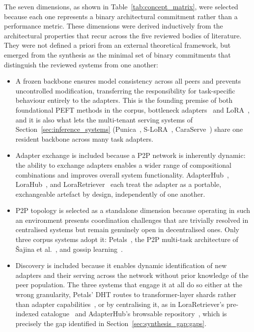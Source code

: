 The seven dimensions, as shown in Table~\ref{tab:concept_matrix}, were selected because each one represents a binary architectural commitment rather than a performance metric. These dimensions were derived inductively from the architectural properties that recur across the five reviewed bodies of literature. They were not defined a priori from an external theoretical framework, but emerged from the synthesis as the minimal set of binary commitments that distinguish the reviewed systems from one another:
\begin{itemize}
    \item A frozen backbone ensures model consistency across all peers and prevents uncontrolled modification, transferring the responsibility for task-specific behaviour entirely to the adapters. This is the founding premise of both foundational PEFT methods in the corpus, bottleneck adapters~\cite{Houlsby2019} and LoRA~\cite{Hu2022}, and it is also what lets the multi-tenant serving systems of Section~\ref{sec:inference_systems} (Punica~\cite{Chen2023Punica}, S-LoRA~\cite{Sheng2024}, CaraServe~\cite{Li2024CaraServe}) share one resident backbone across many task adapters.
    \item Adapter exchange is included because a P2P network is inherently dynamic: the ability to exchange adapters enables a wider range of compositional combinations and improves overall system functionality. AdapterHub~\cite{Pfeiffer2020hub}, LoraHub~\cite{Huang2023}, and LoraRetriever~\cite{ZhaoLoraRetriever2024} each treat the adapter as a portable, exchangeable artefact by design, independently of one another.
    \item P2P topology is selected as a standalone dimension because operating in such an environment presents coordination challenges that are trivially resolved in centralised systems but remain genuinely open in decentralised ones. Only three corpus systems adopt it: Petals~\cite{Borzunov2023}, the P2P multi-task architecture of {\v{S}}ajina et al.~\cite{Sajina2024}, and gossip learning~\cite{HegeduisGossip2019}.
    \item Discovery is included because it enables dynamic identification of new adapters and their serving across the network without prior knowledge of the peer population. The three systems that engage it at all do so either at the wrong granularity, Petals' DHT routes to transformer-layer shards rather than adapter capabilities~\cite{Borzunov2023}, or by centralising it, as in LoraRetriever's pre-indexed catalogue~\cite{ZhaoLoraRetriever2024} and AdapterHub's browsable repository~\cite{Pfeiffer2020hub}, which is precisely the gap identified in Section~\ref{sec:synthesis_gap:gaps}.

\end{itemize}
